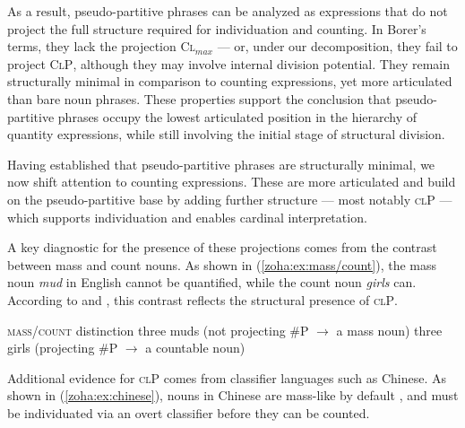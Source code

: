 \documentclass[output=paper,colorlinks,citecolor=brown
]{langscibook}
\begin{document}
As a result, pseudo-partitive phrases can be analyzed as expressions that do not project the full structure required for individuation and counting. In Borer’s terms, they lack the projection \textsc{Cl$_{max}$} — or, under our decomposition, they fail to project \textsc{ClP}, although they may involve internal division potential. They remain structurally minimal in comparison to counting expressions, yet more articulated than bare noun phrases. These properties support the conclusion that pseudo-partitive phrases occupy the lowest articulated position in the hierarchy of quantity expressions, while still involving the initial stage of structural division.

Having established that pseudo-partitive phrases are structurally minimal, we now shift attention to counting expressions. These are more articulated and build on the pseudo-partitive base by adding further structure — most notably \textsc{clP} — which supports individuation and enables cardinal interpretation.

A key diagnostic for the presence of these projections comes from the contrast between mass and count nouns. As shown in (\ref{zoha:ex:mass/count}), the mass noun \textit{mud} in English cannot be quantified, while the count noun \textit{girls} can. According to \citet{Borer2005} and \citet{Caha2022}, this contrast reflects the structural presence of \textsc{clP}.

\ea \textsc{mass/count} distinction \citep{Rothstein2010} \label{zoha:ex:mass/count} 
    \ea *three muds \label{zoha:ex:muds} \hfill (not projecting \#P $\rightarrow$ a mass noun)
    \ex  \phantom{*}three girls \label{zoha:ex:girls} \hfill (projecting \#P $\rightarrow$ a countable noun)
    \z
\z

\noindent Additional evidence for \textsc{clP} comes from classifier languages such as Chinese. As shown in (\ref{zoha:ex:chinese}), nouns in Chinese are mass-like by default \citep{chierchia1998,chierchia1998reference}, and must be individuated via an overt classifier before they can be counted.

\ea \label{zoha:ex:chinese} 
    \z
\z
\end{document}

